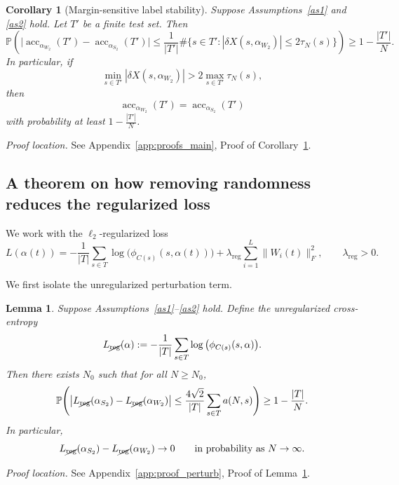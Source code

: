 \documentclass[11pt]{article}
\theoremstyle{plain}
\newtheorem{cor}[thm]{Corollary}
\newtheorem{lem}[thm]{Lemma}
\theoremstyle{definition}
\theoremstyle{remark}
\newcommand{\PP}{\mathbb{P}}
\newcommand{\acc}{\operatorname{acc}}
\newcommand{\1}{\mathbf{1}}
\newcommand{\proofloc}[1]{\par\noindent\emph{Proof location.} #1\par}
\begin{document}
\begin{cor}[Margin-sensitive label stability]
\label{cor:margin_accuracy}
Suppose Assumptions~\ref{as1} and \ref{as2} hold. Let \(T'\) be a finite test set. Then
\[
\PP\!\left(
\big|\acc_{\alpha_{W_2}}(T')-\acc_{\alpha_{S_2}}(T')\big|
\le
\frac1{|T'|}
\#\Big\{
s\in T': |\delta X(s,\alpha_{W_2})|\le 2\tau_N(s)
\Big\}
\right)
\ge
1-\frac{|T'|}{N}.
\]
In particular, if
\[
\min_{s\in T'} |\delta X(s,\alpha_{W_2})|
>
2\max_{s\in T'}\tau_N(s),
\]
then
\[
\acc_{\alpha_{W_2}}(T')=\acc_{\alpha_{S_2}}(T')
\]
with probability at least \(1-\frac{|T'|}{N}\).
\end{cor}
\proofloc{See Appendix~\ref{app:proofs_main}, Proof of Corollary~\ref{cor:margin_accuracy}.}

\subsection{A theorem on how removing randomness reduces the regularized loss}

We work with the \(\ell_2\)-regularized loss
\begin{equation}
\label{loss_noise_det_1}
L(\alpha(t))
=
-\frac{1}{|T|}\sum_{s\in T}\log\big(\phi_{C(s)}(s,\alpha(t))\big)
+
\lambda_{\mathrm{reg}}
\sum_{i=1}^{L}\|W_i(t)\|_F^2,
\qquad \lambda_{\mathrm{reg}}>0.
\end{equation}

We first isolate the unregularized perturbation term.

\begin{lem}
\label{lem:remove_R_loosandacc}
Suppose Assumptions~\ref{as1}--\ref{as2} hold. Define the unregularized cross-entropy
\[
L_{\cancel{\mathrm{reg}}}(\alpha)
:=
-\frac{1}{|T|}\sum_{s\in T}\log\big(\phi_{C(s)}(s,\alpha)\big).
\]
Then there exists \(N_0\) such that for all \(N\ge N_0\),
\[
\PP\!\left(
\big|L_{\cancel{\mathrm{reg}}}(\alpha_{S_2})-L_{\cancel{\mathrm{reg}}}(\alpha_{W_2})\big|
\le
\frac{4\sqrt{2}}{|T|}\sum_{s\in T} a(N,s)
\right)
\ge
1-\frac{|T|}{N}.
\]
In particular,
\[
L_{\cancel{\mathrm{reg}}}(\alpha_{S_2})-L_{\cancel{\mathrm{reg}}}(\alpha_{W_2})
\to 0
\qquad\text{in probability as }N\to\infty.
\]
\end{lem}
\proofloc{See Appendix~\ref{app:proof_perturb}, Proof of Lemma~\ref{lem:remove_R_loosandacc}.}
\end{document}
